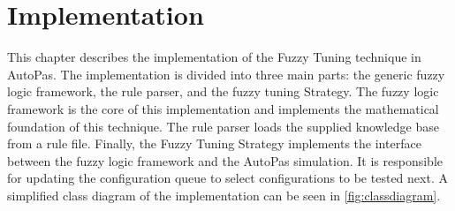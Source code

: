 \chapter{Implementation}
\label{sec:implementation}

\newcommand{\fuzzySetNodeOneD}[4]{
  \begin{tikzpicture}
    \begin{axis}%
      [
        axis line style={black},
        width=4.5cm,
        height=3cm,
        axis lines=center,
        xlabel={#1},
        x label style={at={(axis description cs:0.9,0.25)},anchor=north},
        ylabel=$\mu$,
        y label style={at={(axis description cs:0.5,1)},anchor=south},
        xmin=-6,
        xmax=6,
        ytick={},
        yticklabels={},
        extra x ticks={0},
        extra x tick labels={#3},
        ymax=1,
        samples=25,
        extra y ticks={1},
        every axis plot/.append style={thick}
      ]
      \addplot[red]  {#4};
    \end{axis}
    \node[above,font=\large\bfseries,inner sep=5pt] at (current bounding box.north) {\shortstack{FuzzySet\\#2}};
  \end{tikzpicture}
}

\newcommand{\fuzzySetNodeTwoD}[4]{
  \begin{tikzpicture}
    \begin{axis}%
      [
        width=5.5cm,
        height=4cm,
        axis lines=center,
        xlabel={#1},
        x label style={at={(axis description cs:0.1,0.4)},anchor=north},
        ylabel={#2},
        y label style={at={(axis description cs:0.4,-0.15)},anchor=south},
        zlabel=$\mu$,
        z label style={at={(axis description cs:0.5,0.95)},anchor=south},
        xmin=-6,
        xmax=6,
        colormap/viridis,
        view={10}{40},
        ymin=-6,
        ymax=6,
        zmin=0,
        zmax=1,
      ]
      \addplot3 [
        domain=-6:6,
        samples = 20,
        surf,
      ]{#4};
    \end{axis}
    \node[above,font=\large\bfseries,inner sep=5pt] at (current bounding box.north) { \shortstack{FuzzySet\\#3}};
  \end{tikzpicture}
}


This chapter describes the implementation of the Fuzzy Tuning technique in AutoPas. The implementation is divided into three main parts: the generic fuzzy logic framework, the rule parser, and the fuzzy tuning Strategy. The fuzzy logic framework is the core of this implementation and implements the mathematical foundation of this technique. The rule parser loads the supplied knowledge base from a rule file. Finally, the Fuzzy Tuning Strategy implements the interface between the fuzzy logic framework and the AutoPas simulation. It is responsible for updating the configuration queue to select configurations to be tested next. A simplified class diagram of the implementation can be seen in \autoref{fig:classdiagram}.


